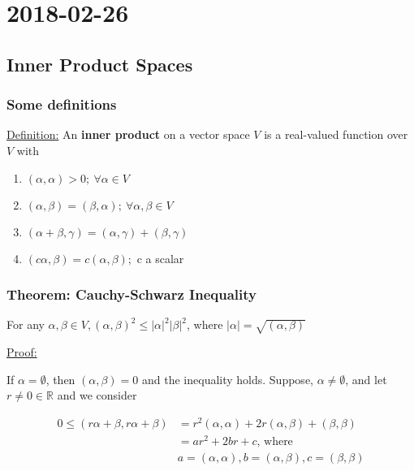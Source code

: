 \section{2018-02-26}

\subsection{Inner Product Spaces}

\subsubsection{Some definitions}

\underline{Definition:} An \textbf{inner product} on a vector space $V$ is a real-valued function over $V$ with

\begin{enumerate}
  \item $(\alpha, \alpha) > 0;\ \forall \alpha \in V$ 
  \item $(\alpha, \beta) = (\beta, \alpha);\ \forall \alpha, \beta \in V$ 
  \item $(\alpha + \beta, \gamma) = (\alpha, \gamma) + (\beta, \gamma)$
  \item $(c\alpha, \beta) = c(\alpha, \beta);$ c a scalar
\end{enumerate}

\subsubsection{Theorem: Cauchy-Schwarz Inequality}

For any $\alpha, \beta \in V, (\alpha, \beta)^2 \leq |\alpha|^2 |\beta|^2$, where $|\alpha| = \sqrt{(\alpha, \beta)}$

\underline{Proof:}

If $\alpha = \emptyset$, then $(\alpha, \beta) = 0$ and the inequality holds. Suppose, $\alpha \neq \emptyset$, and let $r \neq 0 \in \mathbb{R}$ and we consider

\begin{align*}
  0 \leq (r\alpha + \beta, r\alpha + \beta) & = r^2(\alpha, \alpha) + 2r(\alpha, \beta) + (\beta, \beta) \\
                                            & = a r^2 + 2br + c\text{, where} \\
                                            & a = (\alpha, \alpha), b = (\alpha, \beta), c = (\beta, \beta)
\end{align*}


